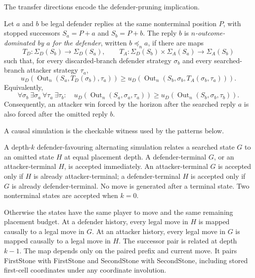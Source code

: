The transfer directions encode the defender-pruning implication.

\begin{definition}
\label{def:Dom-D5}
Let $a$ and $b$ be legal defender replies at the same nonterminal position
$P$, with stopped successors $S_a=P+a$ and $S_b=P+b$.  The reply $b$ is
\emph{$n$-outcome-dominated by $a$ for the defender}, written
$b\preceq_n a$, if there are maps
\[
  T_D:\Sigma_D(S_b)\to\Sigma_D(S_a),
  \qquad
  T_A:\Sigma_D(S_b)\times\Sigma_A(S_a)\to\Sigma_A(S_b)
\]
such that, for every discarded-branch defender strategy $\sigma_b$ and every
searched-branch attacker strategy $\tau_a$,
\[
 u_D\!\left(\operatorname{Out}_n
     (S_a,T_D(\sigma_b),\tau_a)\right)
 \ge
 u_D\!\left(\operatorname{Out}_n
     (S_b,\sigma_b,T_A(\sigma_b,\tau_a))\right).
\]
Equivalently,
\[
  \forall\sigma_b\ \exists\sigma_a\
  \forall\tau_a\ \exists\tau_b:\quad
  u_D(\operatorname{Out}_n(S_a,\sigma_a,\tau_a))
  \ge u_D(\operatorname{Out}_n(S_b,\sigma_b,\tau_b)).
\]
Consequently, an attacker win forced by the horizon after the searched reply
$a$ is also forced after the omitted reply $b$.
\end{definition}

A causal simulation is the checkable witness used by the patterns below.

\begin{definition}
\label{def:Dom-D6}
A depth-$k$ defender-favouring alternating simulation relates a searched state
$G$ to an omitted state $H$ at equal placement depth.  A defender-terminal
$G$, or an attacker-terminal $H$, is accepted immediately.  An
attacker-terminal $G$ is accepted only if $H$ is already attacker-terminal;
a defender-terminal $H$ is accepted only if $G$ is already
defender-terminal.  No move is generated after a terminal state.  Two
nonterminal states are accepted when $k=0$.

Otherwise the states have the same player to move and the same remaining
placement budget.  At a defender history, every legal move in $H$ is mapped
causally to a legal move in $G$.  At an attacker history, every legal move in
$G$ is mapped causally to a legal move in $H$.  The successor pair is related
at depth $k-1$.  The map depends only on the paired prefix and current move.
It pairs \textup{FirstStone} with \textup{FirstStone} and
\textup{SecondStone} with \textup{SecondStone}, including stored first-cell
coordinates under any coordinate involution.
\end{definition}

